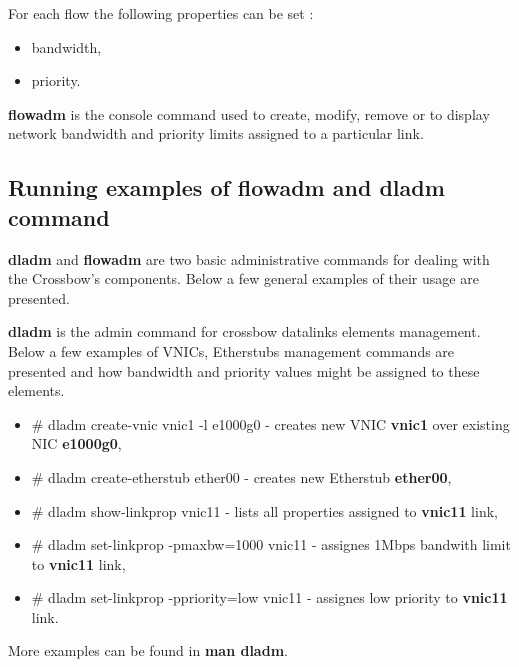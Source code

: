 \documentclass[11pt]{book}
\begin{document}
          For each flow the following properties can be set \cite{flows2}: 

          \begin{itemize}
            \item bandwidth,
            \item priority.
          \end{itemize}

          \medskip

          

          \textbf{flowadm} is the console command used to create, modify, remove or to display network bandwidth and
          priority limits assigned to a particular link. 


      \subsection{Running examples of flowadm and dladm command}

        \textbf{dladm} and \textbf{flowadm} are two basic administrative commands for dealing with the Crossbow's
        components. Below a few general examples of their usage are presented.
  
        \textbf{dladm} is the admin command for crossbow datalinks elements management. Below a few examples of VNICs,
        Etherstubs management commands are presented and how bandwidth and priority values might be assigned to these
        elements.
  
        \begin{itemize}
          \item \# dladm create-vnic vnic1 -l e1000g0 - creates new VNIC \textbf{vnic1} over existing NIC \textbf{e1000g0},
          \item \# dladm create-etherstub ether00 - creates new Etherstub \textbf{ether00},
          \item \# dladm show-linkprop vnic11 - lists all properties assigned to \textbf{vnic11} link,
          \item \# dladm set-linkprop -pmaxbw=1000 vnic11 - assignes 1Mbps bandwith limit to \textbf{vnic11} link,
          \item \# dladm set-linkprop -ppriority=low vnic11 - assignes low priority to \textbf{vnic11} link.
        \end{itemize}
  
        More examples can be found in \textbf{man dladm}.

        \medskip
\end{document}
